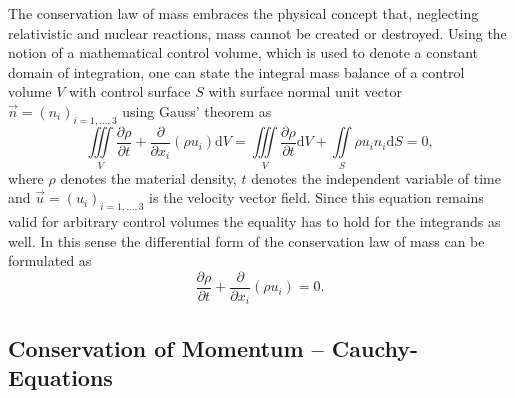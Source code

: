     The conservation law of mass embraces the physical concept that, neglecting relativistic and nuclear reactions, mass cannot be created or destroyed. Using the notion of a mathematical control volume, which is used to denote a constant domain of integration, one can state the integral mass balance of a control volume \(V\) with control surface \(S\) with surface normal unit vector \(\vec{n} = \left( n_i \right)_{i=1,\dots,3}\) using Gauss' theorem as
    \begin{displaymath}
      \iiint\limits_V \frac{\partial \rho}{\partial t} + \frac{\partial}{\partial x_i}\left( \rho u_i \right) \mathrm{d}V 
      =  \iiint\limits_V \frac{\partial \rho}{\partial t} \mathrm{d}V + \iint\limits_S \rho u_i n_i \mathrm{d}S
      = 0,
    \end{displaymath}
    where \( \rho \) denotes the material density, \(t \) denotes the independent variable of time and \(\vec{u} = \left( u_i \right)_{i=1,\dots,3}\) is the velocity vector field. Since this equation remains valid for arbitrary control volumes the equality has to hold for the integrands as well. In this sense the differential form of the conservation law of mass can be formulated as
    \begin{equation}
      \label{eq:contifull}
      \frac{\partial \rho}{\partial t} + \frac{\partial}{\partial x_i}\left( \rho u_i \right)
      = 0.
    \end{equation}

    \subsection{Conservation of Momentum -- Cauchy-Equations}

